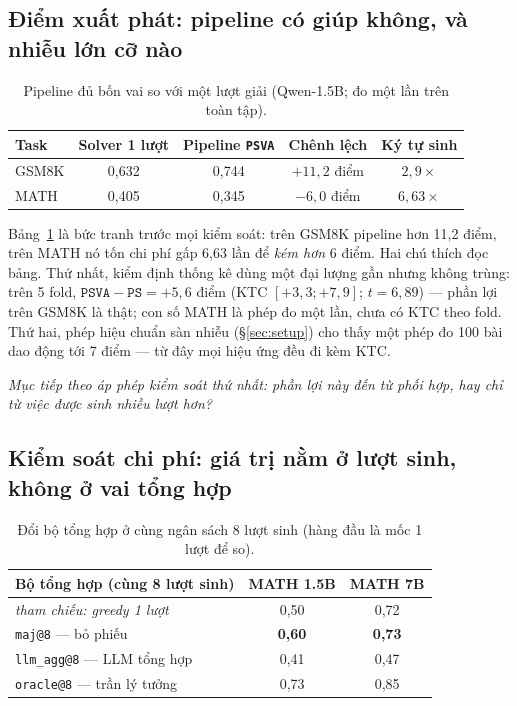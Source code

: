\documentclass[11pt,a4paper]{article}
\begin{document}
\subsection{Điểm xuất phát: pipeline có giúp không, và nhiễu lớn cỡ nào}\label{sec:start}

\begin{table}[t]\centering\small
\begin{tabular}{lcccc}\toprule
Task & Solver 1 lượt & Pipeline \texttt{PSVA} & Chênh lệch & Ký tự sinh\\\midrule
GSM8K & 0,632 & 0,744 & $+11{,}2$ điểm & $2{,}9\times$\\
MATH  & 0,405 & 0,345 & $-6{,}0$ điểm & $6{,}63\times$\\\bottomrule
\end{tabular}
\caption{Pipeline đủ bốn vai so với một lượt giải (Qwen-1.5B; đo một lần trên toàn tập).}
\label{tab:pipeline}
\end{table}

Bảng~\ref{tab:pipeline} là bức tranh trước mọi kiểm soát: trên GSM8K pipeline hơn 11,2 điểm,
trên MATH nó tốn chi phí gấp 6,63 lần để \emph{kém hơn} 6 điểm. Hai chú thích đọc bảng. Thứ
nhất, kiểm định thống kê dùng một đại lượng gần nhưng không trùng: trên 5 fold,
$\texttt{PSVA}-\texttt{PS} = +5{,}6$ điểm (KTC $[+3{,}3;+7{,}9]$; $t=6{,}89$) --- phần lợi trên
GSM8K là thật; con số MATH là phép đo một lần, chưa có KTC theo fold. Thứ hai, phép hiệu chuẩn
sàn nhiễu (\S\ref{sec:setup}) cho thấy một phép đo 100 bài dao động tới 7 điểm --- từ đây mọi
hiệu ứng đều đi kèm KTC.

\emph{Mục tiếp theo áp phép kiểm soát thứ nhất: phần lợi này đến từ phối hợp, hay chỉ từ việc
được sinh nhiều lượt hơn?}

\subsection{Kiểm soát chi phí: giá trị nằm ở lượt sinh, không ở vai tổng hợp}\label{sec:budget}

\begin{table}[t]\centering\small
\begin{tabular}{lcc}\toprule
Bộ tổng hợp (cùng 8 lượt sinh) & MATH 1.5B & MATH 7B\\\midrule
\emph{tham chiếu: greedy 1 lượt} & 0,50 & 0,72\\
\texttt{maj@8} --- bỏ phiếu     & \textbf{0,60} & \textbf{0,73}\\
\texttt{llm\_agg@8} --- LLM tổng hợp & 0,41 & 0,47\\
\texttt{oracle@8} --- trần lý tưởng      & 0,73 & 0,85\\\bottomrule
\end{tabular}
\caption{Đổi bộ tổng hợp ở cùng ngân sách 8 lượt sinh (hàng đầu là mốc 1 lượt để so).}
\label{tab:budget}
\end{table}
\end{document}
